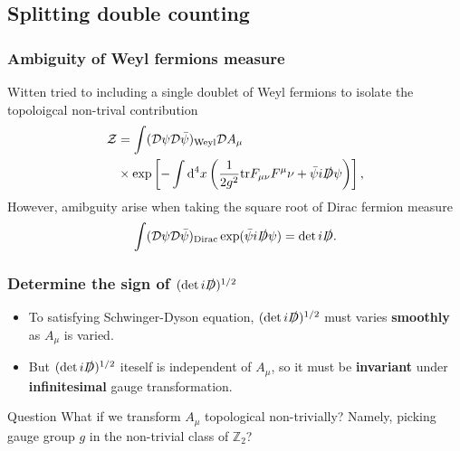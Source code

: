 \documentclass[10pt,aspectratio=43,xcolor=x11names,t]{beamer}%
\begin{document}
	\subsection{Splitting double counting}
		\begin{frame}
			\frametitle{Ambiguity of Weyl fermions measure}
			Witten tried to including a single doublet of Weyl fermions to isolate the topoloigcal non-trival contribution
			\begin{align*}
				\mathcal{Z}&=\int(\mathcal{D}\psi\mathcal{D}\bar{\psi})_{\text{Weyl}}\mathcal{D}A_\mu\\
				&\times\exp \left[-\int\mathop{}\!\mathrm{d}^4x \left(\dfrac{1}{2g^2}\mathrm{tr}F_{\mu\nu}F^\mu\nu+\bar{\psi}i\slashed{D}\psi\right) \right],
			\end{align*}
			\pause
			However, amibguity arise when taking the square root of Dirac fermion measure
			\begin{equation*}
				\int(\mathcal{D}\psi\mathcal{D}\bar{\psi})_{\text{Dirac}}\exp(\bar{\psi} i\slashed{D}\psi)=\mathrm{det}\,i\slashed{D}.
			\end{equation*}


		\end{frame}
		\begin{frame}
			\frametitle{Determine the sign of $(\mathrm{det}\,i\slashed{D})^{1/2}$}
			\begin{itemize}
				\item To satisfying Schwinger-Dyson equation, $(\mathrm{det}\,i\slashed{D})^{1/2}$ must varies \textbf{smoothly} as $A_\mu$ is varied.\pause
				\item But $(\mathrm{det}\,i\slashed{D})^{1/2}$ iteself is independent of $A_\mu$, so it must be \textbf{invariant} under \textbf{infinitesimal} gauge transformation.\pause
			\end{itemize}
			\begin{redblock}{Question}
				What if we transform $A_\mu$ topological non-trivially? Namely, picking gauge group $g$ in the non-trivial class of $\mathbb{Z}_2$?
			\end{redblock}
		\end{frame}
\end{document}
